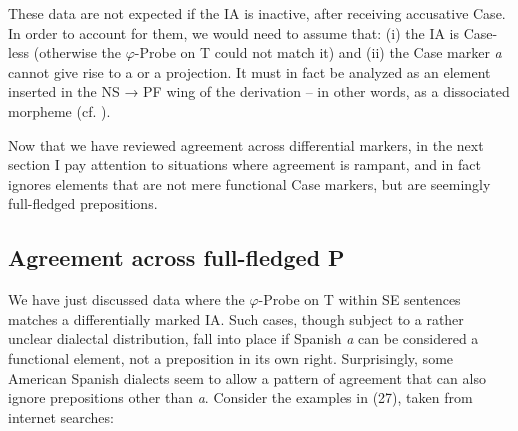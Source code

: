 \documentclass[output=paper]{langsci/langscibook}
\begin{document}
These data are not expected if the IA is inactive, after receiving accusative Case. In order to account for them, we would need to assume that: (i) the IA is Case-less (otherwise the $\varphi $-Probe on T could not match it) and (ii) the Case marker \textit{a} cannot give rise to a \CATPP or a \CATKP projection. It must in fact be analyzed as an element inserted in the NS → PF wing of the derivation – in other words, as a dissociated morpheme (cf. \citealt{Halle1993}).

  Now that we have reviewed agreement across differential markers, in the next section I pay attention to situations where agreement is rampant, and in fact ignores elements that are not mere functional Case markers, but are seemingly full-fledged prepositions.

\subsection{Agreement across full-fledged P}%

We have just discussed data where the $\varphi $-Probe on T within SE sentences matches a differentially marked IA. Such cases, though subject to a rather unclear dialectal distribution, fall into place if Spanish \textit{a} can be considered a functional element, not a preposition in its own right. Surprisingly, some American Spanish dialects seem to allow a pattern of agreement that can also ignore prepositions other than \textit{a}. Consider the examples in (27), taken from internet searches:
\end{document}
